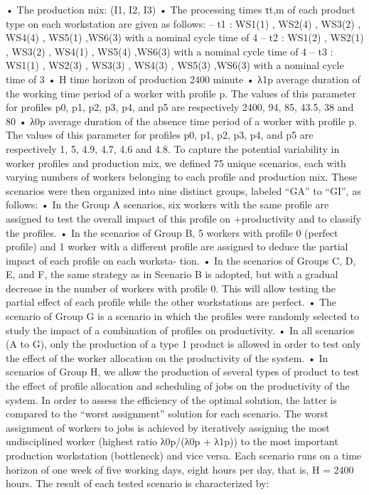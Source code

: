 •	The production mix: (I1, I2, I3)
•	The processing times τt,m of each product type on each workstation are given as follows:
–	t1 : WS1(1) , WS2(4) , WS3(2) , WS4(4) , WS5(1) ,WS6(3) with a nominal cycle time of 4
–	t2 : WS1(2) , WS2(1) , WS3(2) , WS4(1) , WS5(4) ,WS6(3) with a nominal cycle time of 4
–	t3 : WS1(1) , WS2(3) , WS3(3) , WS4(3) , WS5(3) ,WS6(3) with a nominal cycle time of 3 • H time horizon of production 2400 minute
•	λ1p average duration of the working time period of a worker with profile p. The values of this parameter for profiles p0, p1, p2, p3, p4, and p5 are respectively 2400, 94, 85, 43.5, 38 and 80
•	λ0p average duration of the absence time period of a worker with profile p. The values of this parameter for profiles p0, p1, p2, p3, p4, and p5 are respectively 1, 5, 4.9, 4.7, 4.6 and 4.8.
To capture the potential variability in worker profiles and production mix, we defined 75 unique scenarios, each with varying numbers of workers belonging to each profile and production mix. These scenarios were then organized into nine distinct groups, labeled “GA” to “GI”, as follows:
•	In the Group A scenarios, six workers with the same profile are assigned to test the overall impact of this profile on +productivity and to classify the profiles.
•	In the scenarios of Group B, 5 workers with profile 0 (perfect profile) and 1 worker with a different profile are assigned to deduce the partial impact of each profile on each worksta-
tion.
•	In the scenarios of Groups C, D, E, and F, the same strategy as in Scenario B is adopted, but with a gradual decrease in the number of workers with profile 0. This will allow testing the partial effect of each profile while the other workstations are perfect.
•	The scenario of Group G is a scenario in which the profiles were randomly selected to study the impact of a combination of profiles on productivity.
•	In all scenarios (A to G), only the production of a type 1 product is allowed in order to test only the effect of the worker allocation on the productivity of the system.
•	In scenarios of Group H, we allow the production of several types of product to test the effect of profile allocation and scheduling of jobs on the productivity of the system.
In order to assess the efficiency of the optimal solution, the latter is compared to the “worst assignment” solution for each scenario. The worst assignment of workers to jobs is achieved by iteratively assigning the most undisciplined worker (highest ratio λ0p/(λ0p + λ1p)) to the most important production workstation (bottleneck) and vice versa.
Each scenario runs on a time horizon of one week of five working days, eight hours per day, that is, H = 2400 hours. The result of each tested scenario is characterized by:
